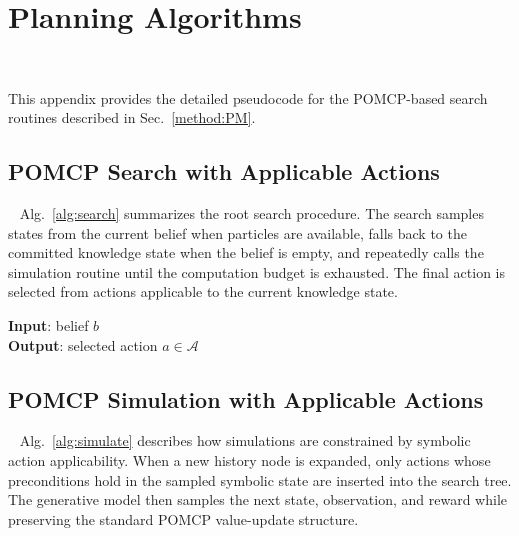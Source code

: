 \section{Planning Algorithms}~\label{appx:algorithms}

This appendix provides the detailed pseudocode for the POMCP-based search routines described in Sec.~\ref{method:PM}.

\normalem
\subsection{POMCP Search with Applicable Actions}~\label{appx:alg_search}
Alg.~\ref{alg:search} summarizes the root search procedure. The search samples states from the current belief when particles are available, falls back to the committed knowledge state when the belief is empty, and repeatedly calls the simulation routine until the computation budget is exhausted. The final action is selected from actions applicable to the current knowledge state.

\begin{algorithm}[h]
\caption{POMCP Search with Applicable Actions}
\label{alg:search}
\textbf{Input}: belief $b$ \\
\textbf{Output}: selected action $a \in \mathcal{A}$
\BlankLine

\end{algorithm}

\subsection{POMCP Simulation with Applicable Actions}~\label{appx:alg_simulate}
Alg.~\ref{alg:simulate} describes how simulations are constrained by symbolic action applicability. When a new history node is expanded, only actions whose preconditions hold in the sampled symbolic state are inserted into the search tree. The generative model then samples the next state, observation, and reward while preserving the standard POMCP value-update structure.


